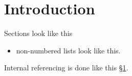 \section{Introduction}\label{submarine}
Sections look like this

\begin{itemize}
\item non-numbered lists look like this.
\end{itemize}
Internal referencing is done like this \S\ref{submarine}.
